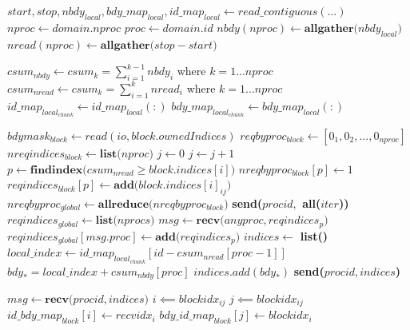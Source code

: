 \documentclass{article}
\begin{document}
\vspace{5mm}
\begin{algorithm}
\caption{Compute the $nbdy$ decomposition}\label{decomp}
\begin{algorithmic}[2]
    \State
    \State $start, stop, nbdy_{local}, bdy\_map_{local}, id\_map_{local} \gets read\_contiguous(...)$
    \State $nproc \gets domain.nproc$
    \State $proc \gets domain.id$
    \State $nbdy(nproc) \gets \textbf{allgather($nbdy_{local}$)}$
    \State $nread(nproc) \gets \textbf{allgather($stop - start$)}$

    \State $csum_{nbdy} \gets csum_k = \sum_{i=1}^{k-1} nbdy_i$ where $k = 1 ... nproc$
    \State $csum_{nread} \gets csum_k = \sum_{i=1}^{k} nread_i$ where $k = 1 ... nproc$
    \State $id\_map_{local_{chunk}} \gets id\_map_{local}(:)$
    \State $bdy\_map_{local_{chunk}} \gets bdy\_map_{local}(:)$

    \State $bdymask_{block} \gets read(io, block.ownedIndices)$
    \State $reqbyproc_{block} \gets [0_1, 0_2, ..., 0_{nproc}]$
    \State $nreqindices_{block} \gets \textbf{list($nproc$)}$
    \State
    \State $j \gets 0$
            \State $j \gets j + 1$
            \State $p \gets \textbf{findindex($csum_{nread} \ge block.indices[i]$)}$
            \State $nreqbyproc_{block}[p] \gets 1$
            \State $reqindices_{block}[p] \gets \textbf{add($block.indices[i]_{ij}$)}$
        \EndIf
    \EndFor
    \State
    \State $nreqbyproc_{global} \gets \textbf{allreduce($nreqbyproc_{block}$)}$
    \State
            \State \textbf{send($procid,$ all($iter$))}
        \EndIf
    \EndFor
    \State
    \State $reqindices_{global} \gets \textbf{list($nprocs$)}$
        \State $msg \gets \textbf{recv($anyproc, reqindices_p$)}$
        \State $reqindices_{global}[msg.proc] \gets \textbf{add($reqindices_p$)}$
    \EndFor
    \State
            \State $indices \gets$ \textbf{list()}
                \State $local\_index \gets id\_map_{local_{chunk}}[id - csum_{nread}[proc-1]]$
                \State $bdy_*= local\_index + csum_{nbdy}[proc]$
                \State $indices.add(bdy_*)$
            \EndFor
            \State \textbf{send($procid, indices$)}
        \EndIf
    \EndFor
    \State

            \State $msg \gets \textbf{recv($procid, indices$)}$
                \State $i \impliedby blockidx_{ij}$
                \State $j \impliedby blockidx_{ij}$
                \State $id\_bdy\_map_{block}[i] \gets recvidx_i$
                \State $bdy\_id\_map_{block}[j] \gets blockidx_i$
            \EndFor
        \EndIf
    \EndFor
\EndFunction
\end{algorithmic}
\end{algorithm}
\end{document}
